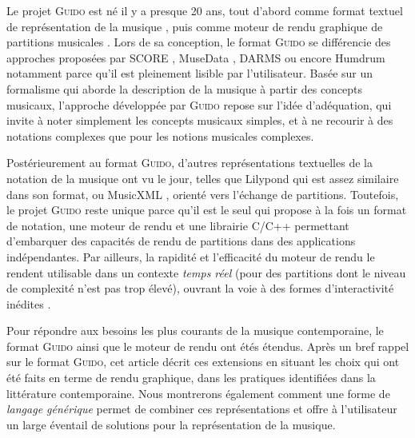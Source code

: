 \documentclass{article}
\newcommand{\guido}			{\textsc{Guido}}
\begin{document}
Le projet \guido{} est né il y a presque 20 ans, tout d'abord comme format textuel de représentation de la musique \cite{hoos98,guido}, puis comme moteur de rendu graphique de partitions musicales \cite{RENZ02}. 
Lors de sa conception, le format \guido{} se différencie des approches proposées par SCORE \cite{SCORE}, MuseData \cite{Hewlett97}, DARMS \cite{darms} ou encore Humdrum \cite{Huron97} notamment parce qu'il est pleinement lisible par l'utilisateur. Basée sur un formalisme qui aborde la description de la musique à partir des concepts musicaux, l'approche développée par \guido{} repose sur l'idée d'adéquation, qui invite à noter simplement les concepts musicaux simples, et à ne recourir à des notations complexes que pour les notions musicales complexes.

Postérieurement au format \guido{}, d'autres représentations textuelles de la notation de la musique ont vu le jour, telles que Lilypond \cite{lilypond03,lilypond06} qui est assez similaire dans son format, ou MusicXML \cite{good01}, orienté vers l'échange de partitions. Toutefois, le projet \guido{} reste unique parce qu'il est le seul qui propose à la fois un format de notation, une moteur de rendu et une librairie C/C++ permettant d'embarquer des capacités de rendu de partitions dans des applications indépendantes.
Par ailleurs, la rapidité et l'efficacité du moteur de rendu le rendent utilisable dans un contexte \textit{temps réel} (pour des partitions dont le niveau de complexité n'est pas trop élevé), ouvrant la voie à des formes d'interactivité inédites \cite{Hoadley12,Fober:12a}.

Pour répondre aux besoins les plus courants de la musique contemporaine, le format \guido{} ainsi que le moteur de rendu ont étés étendus. Après un bref rappel sur le format \guido{}, cet article décrit ces extensions en  situant les choix qui ont été faits en terme de rendu graphique, dans les pratiques identifiées dans la littérature contemporaine. Nous montrerons également comment une forme de \emph{langage générique} permet de combiner ces représentations et offre à l'utilisateur un large éventail de solutions pour la représentation de la musique.
\end{document}
